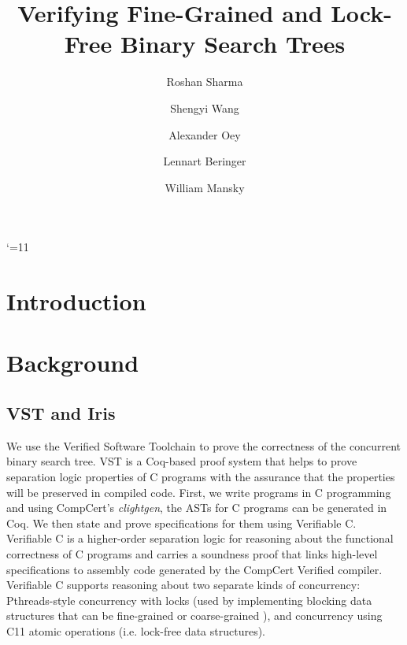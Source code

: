 \documentclass[acmsmall,screen]{acmart}\settopmatter{printfolios=true}
\title{Verifying Fine-Grained and Lock-Free Binary Search Trees}
\author{Roshan Sharma}
\author{Shengyi Wang}
\author{Alexander Oey}
\author{Lennart Beringer}
\author{William Mansky}
\date{} %
\begin{document}
\maketitle

\catcode`\@=11
\section{Introduction}


\section{Background}
\label{background}
\subsection{VST and Iris}
We use the Verified Software Toolchain \cite{plfcc}  to prove the correctness of the concurrent binary search tree. VST is a Coq-based proof system that helps to prove separation logic properties of C programs with the assurance that the properties will be preserved in compiled code. First, we write programs in C programming and using CompCert’s \emph{clightgen}, the ASTs for C programs can be generated in Coq. We then state and prove specifications for them using Verifiable C. Verifiable C is a higher-order separation logic for reasoning about the functional correctness of C programs and carries a soundness proof that links high-level specifications to assembly code generated by the CompCert Verified compiler. Verifiable C supports reasoning about two separate kinds of concurrency:  Pthreads-style concurrency with locks (used by implementing blocking data structures that can be fine-grained or coarse-grained ), and concurrency using C11 atomic operations (i.e. lock-free data structures). 
\end{document}
